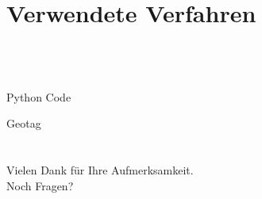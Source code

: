 \documentclass[12pt]{beamer}
\begin{document}
\section{Verwendete Verfahren}
 \subsection*{~}
\begin{frame}{Python Code}

\end{frame}

\begin{frame}{Geotag}

\end{frame}

\section*{}
\begin{frame}
\centering
{\Large Vielen Dank für Ihre Aufmerksamkeit. \\ Noch Fragen?}
\end{frame}
\end{document}

